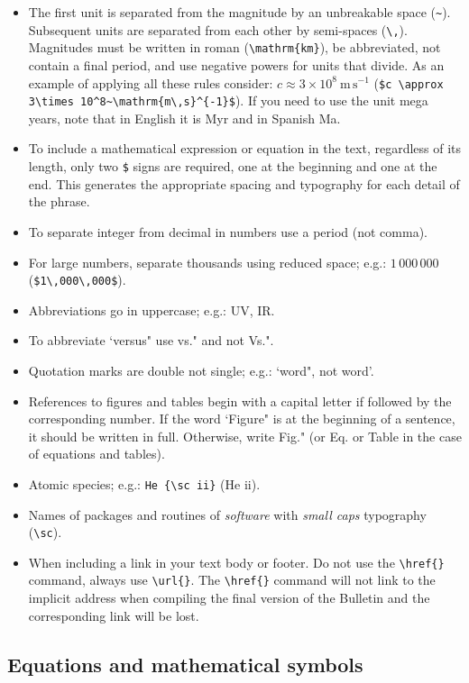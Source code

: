 \documentclass[baaa]{baaa}
\begin{document}
\begin{itemize}
 \item The first unit is separated from the magnitude by an unbreakable space (\verb|~|). Subsequent units are separated from each other by semi-spaces (\verb|\,|). Magnitudes must be written in roman (\verb|\mathrm{km}|), be abbreviated, not contain a final period, and use negative powers for units that divide. As an example of applying all these rules consider: $c \approx 3 \times 10^8~\mathrm{m\,s}^{-1}$ (\verb|$c \approx 3\times 10^8~\mathrm{m\,s}^{-1}$|). If you need to use the unit mega years, note that in English it is Myr and in Spanish Ma.
 \item To include a mathematical expression or equation in the text, regardless of its length, only two \verb|$| signs are required, one at the beginning and one at the end. This generates the appropriate spacing and typography for each detail of the phrase.
  \item To separate integer from decimal in numbers use a period (not comma).
  \item For large numbers, separate thousands using reduced space; e.g.: $1\,000\,000$ (\verb+$1\,000\,000$+).
  \item Abbreviations go in uppercase; e.g.: UV, IR.
  \item To abbreviate `versus" use vs." and not Vs.".
  \item Quotation marks are double not single; e.g.: `word", not word'.
  \item References to figures and tables begin with a capital letter if followed by the corresponding number. If the word `Figure" is at the beginning of a sentence, it should be written in full. Otherwise, write Fig." (or Eq. or Table in the case of equations and tables).
  \item Atomic species; e.g.: \verb|He {\sc ii}| (He {\sc ii}).
  \item Names of {\sc packages} and {\sc routines} of {\em software} with {\em small caps} typography (\verb|\sc|).
  \item When including a link in your text body or footer. Do not use the \verb|\href{}| command, always use \verb|\url{}|. The \verb|\href{}| command will not link to the implicit address when compiling the final version of the Bulletin and the corresponding link will be lost.
\end{itemize}

\subsection{Equations and mathematical symbols}
\end{document}
